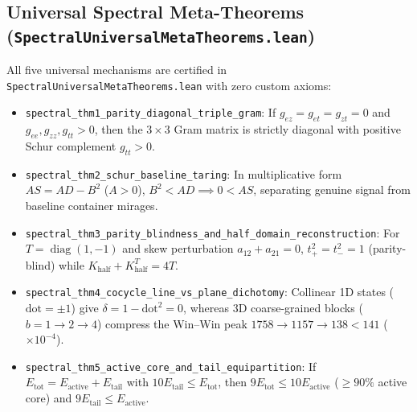 \documentclass[11pt,a4paper]{article}
\begin{document}
\subsection{Universal Spectral Meta-Theorems (\texttt{SpectralUniversalMetaTheorems.lean})}
All five universal mechanisms are certified in \texttt{SpectralUniversalMetaTheorems.lean} with zero custom axioms:
\begin{itemize}
  \item \texttt{spectral\_thm1\_parity\_diagonal\_triple\_gram}: If $g_{ez} = g_{et} = g_{zt} = 0$ and $g_{ee}, g_{zz}, g_{tt} > 0$, then the $3\times 3$ Gram matrix is strictly diagonal with positive Schur complement $g_{tt} > 0$.
  \item \texttt{spectral\_thm2\_schur\_baseline\_taring}: In multiplicative form $A S = A D - B^2$ ($A > 0$), $B^2 < A D \implies 0 < A S$, separating genuine signal from baseline container mirages.
  \item \texttt{spectral\_thm3\_parity\_blindness\_and\_half\_domain\_reconstruction}: For $T = \operatorname{diag}(1, -1)$ and skew perturbation $a_{12} + a_{21} = 0$, $t_+^2 = t_-^2 = 1$ (parity-blind) while $K_{\mathrm{half}} + K_{\mathrm{half}}^T = 4T$.
  \item \texttt{spectral\_thm4\_cocycle\_line\_vs\_plane\_dichotomy}: Collinear 1D states ($\mathrm{dot} = \pm 1$) give $\delta = 1 - \mathrm{dot}^2 = 0$, whereas 3D coarse-grained blocks ($b=1\to 2\to 4$) compress the Win--Win peak $1758 \to 1157 \to 138 < 141$ ($\times 10^{-4}$).
  \item \texttt{spectral\_thm5\_active\_core\_and\_tail\_equipartition}: If $E_{\mathrm{tot}} = E_{\mathrm{active}} + E_{\mathrm{tail}}$ with $10 E_{\mathrm{tail}} \le E_{\mathrm{tot}}$, then $9 E_{\mathrm{tot}} \le 10 E_{\mathrm{active}}$ ($\ge 90\%$ active core) and $9 E_{\mathrm{tail}} \le E_{\mathrm{active}}$.
\end{itemize}
\end{document}
